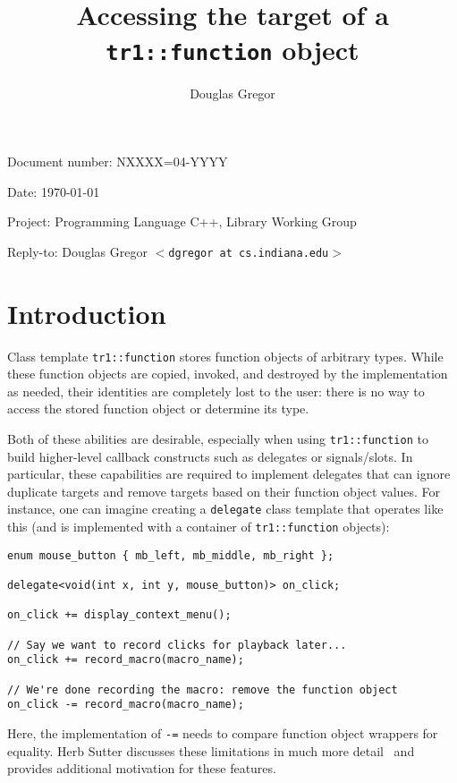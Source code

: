 \documentclass{article}
\begin{document}
\pagestyle{myheadings}

\title{Accessing the target of a \texttt{tr1::function} object}
\author{Douglas Gregor}
\date{}
\maketitle

\par\noindent Document number: NXXXX=04-YYYY
\par\noindent Date: \today
\par\noindent Project: Programming Language C++, Library Working Group
\par\noindent Reply-to: Douglas Gregor $<${\tt dgregor at cs.indiana.edu}$>$

\section{Introduction}
Class template \texttt{tr1::function} stores function objects of
arbitrary types. While these function objects are copied, invoked, and
destroyed by the implementation as needed, their identities are
completely lost to the user: there is no way to access the stored
function object or determine its type. 

Both of these abilities are desirable, especially when
using \texttt{tr1::function} to build higher-level callback constructs
such as delegates or signals/slots. In particular, these capabilities
are required to implement delegates that can ignore duplicate targets
and remove targets based on their function object values. For
instance, one can imagine creating a \texttt{delegate} class template
that operates like this (and is implemented with a container of
\texttt{tr1::function} objects):

\begin{verbatim}
enum mouse_button { mb_left, mb_middle, mb_right };

delegate<void(int x, int y, mouse_button)> on_click;

on_click += display_context_menu();

// Say we want to record clicks for playback later...
on_click += record_macro(macro_name);

// We're done recording the macro: remove the function object
on_click -= record_macro(macro_name);
\end{verbatim}

Here, the implementation of \texttt{-=} needs to compare function
object wrappers for equality. Herb Sutter discusses these limitations in much
more detail~\cite{Sutter03:Observer} and provides additional motivation for
these features.
\end{document}

